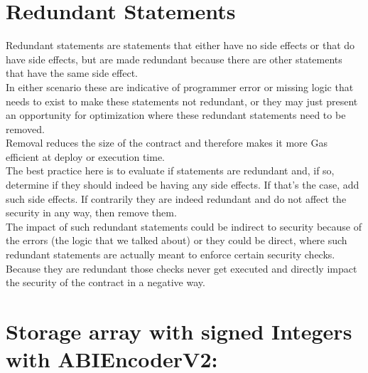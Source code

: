 \section{Redundant Statements}
Redundant statements are statements that either have no side effects or that do have side effects, but are made redundant because there are other statements that have the same side effect. \\

In either scenario these are indicative of programmer error or missing logic that needs to exist to make these statements not redundant, or they may just present an opportunity for optimization where these redundant statements need to be removed.\\

Removal reduces the size of the contract and therefore makes it more Gas efficient at deploy or execution time. \\

The best practice here is to evaluate if statements are redundant and, if so, determine if they should indeed be having any side effects. If that's the case, add such side effects. If contrarily they are indeed redundant and do not affect the security in any way, then remove them. \\

The impact of such redundant statements could be indirect to security because of the errors (the logic that we talked about) or they could be direct, where such redundant statements are actually meant to enforce certain security checks. Because they are redundant those checks never get executed and directly impact the security of the contract in a negative way.


\section{Storage array with signed Integers with ABIEncoderV2:}

